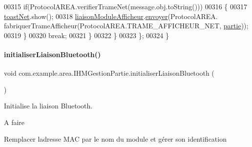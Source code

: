 \begin{DoxyCode}
00315                         \textcolor{keywordflow}{if}(ProtocolAREA.verifierTrameNet(message.obj.toString()))
00316                         \{
00317                             \hyperlink{classcom_1_1example_1_1area_1_1_i_h_m_gestion_partie_a490bd4b5241dfe6a5e709209a939fa2e}{toastNet}.show();
00318                             \hyperlink{classcom_1_1example_1_1area_1_1_i_h_m_gestion_partie_a126a48e2f28ff098e20f0efb4700145f}{liaisonModuleAfficheur}.\hyperlink{classcom_1_1example_1_1area_1_1_liaison_bluetooth_a67360b2f673b47b8a552a9e789a93fce}{envoyer}(ProtocolAREA.
      fabriquerTrameAfficheur(ProtocolAREA.TRAME\_AFFICHEUR\_NET, \hyperlink{classcom_1_1example_1_1area_1_1_i_h_m_gestion_partie_a225e150f813f8fa5c632709a57eacc32}{partie}));
00319                         \}
00320                         \textcolor{keywordflow}{break};
00321                 \}
00322             \}
00323         \};
00324     \}
\end{DoxyCode}
\mbox{\label{classcom_1_1example_1_1area_1_1_i_h_m_gestion_partie_a98f583c39004081b004b854085000256}} 
\paragraph{\texorpdfstring{initialiser\+Liaison\+Bluetooth()}{initialiserLiaisonBluetooth()}}
{\footnotesize\ttfamily void com.\+example.\+area.\+I\+H\+M\+Gestion\+Partie.\+initialiser\+Liaison\+Bluetooth (\begin{DoxyParamCaption}{ }\end{DoxyParamCaption})\hspace{0.3cm}{\ttfamily [private]}}



Initialise la liaison Bluetooth. 

\begin{DoxyRefDesc}{A faire}
\item[\hyperlink{todo__todo000003}{A faire}]Remplacer l\textquotesingle{}adresse M\+AC par le nom du module et gérer son identification \end{DoxyRefDesc}


